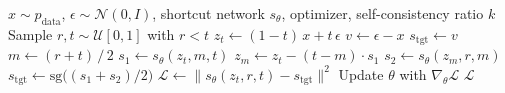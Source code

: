 \begin{algorithm}[htbp]
\caption{Shortcut Model Training}
\label{alg:shortcut_models}
\begin{algorithmic}[1]
\Require $x \sim p_{\text{data}}$, $\epsilon \sim \mathcal{N}(0,I)$, shortcut network $s_\theta$, optimizer, self-consistency ratio $k$
\State Sample $r, t \sim \mathcal{U}[0,1]$ with $r < t$
\State $z_t \gets (1 - t) \, x + t \, \epsilon$ 
\State $v \gets \epsilon - x$ 
    \State $s_{\text{tgt}} \gets v$ 
\Else
    \State $m \gets (r + t) \,/\, 2$ 
    \State $s_1 \gets s_\theta(z_t, m, t)$
    \State $z_m \gets z_t - (t - m) \cdot s_1$ 
    \State $s_2 \gets s_\theta(z_m, r, m)$
    \State $s_{\text{tgt}} \gets \text{sg}\big( (s_1 + s_2) / 2 \big)$ 
\EndIf
\State $\mathcal{L} \gets \| s_\theta(z_t, r, t) - s_{\text{tgt}} \|^2$
\State Update $\theta$ with $\nabla_\theta \mathcal{L}$
\State \Return $\mathcal{L}$
\end{algorithmic}
\end{algorithm}
